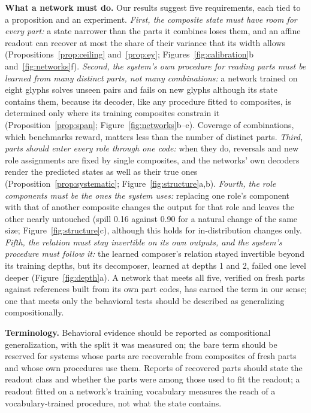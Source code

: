 \documentclass[10pt]{article}
\theoremstyle{plain}
\theoremstyle{remark}
\begin{document}
\textbf{What a network must do.} Our results suggest five requirements, each tied to a proposition and an experiment. \emph{First, the composite state must have room for every part:} a state narrower than the parts it combines loses them, and an affine readout can recover at most the share of their variance that its width allows (Propositions~\ref{prop:ceiling} and~\ref{prop:ey}; Figures~\ref{fig:calibration}b and~\ref{fig:networks}f). \emph{Second, the system's own procedure for reading parts must be learned from many distinct parts, not many combinations:} a network trained on eight glyphs solves unseen pairs and fails on new glyphs although its state contains them, because its decoder, like any procedure fitted to composites, is determined only where its training composites constrain it (Proposition~\ref{prop:span}; Figure~\ref{fig:networks}b--e). Coverage of combinations, which benchmarks reward, matters less than the number of distinct parts. \emph{Third, parts should enter every role through one code:} when they do, reversals and new role assignments are fixed by single composites, and the networks' own decoders render the predicted states as well as their true ones (Proposition~\ref{prop:systematic}; Figure~\ref{fig:structure}a,b). \emph{Fourth, the role components must be the ones the system uses:} replacing one role's component with that of another composite changes the output for that role and leaves the other nearly untouched (spill 0.16 against 0.90 for a natural change of the same size; Figure~\ref{fig:structure}c), although this holds for in-distribution changes only. \emph{Fifth, the relation must stay invertible on its own outputs, and the system's procedure must follow it:} the learned composer's relation stayed invertible beyond its training depths, but its decomposer, learned at depths 1 and 2, failed one level deeper (Figure~\ref{fig:depth}a). A network that meets all five, verified on fresh parts against references built from its own part codes, has earned the term in our sense; one that meets only the behavioral tests should be described as generalizing compositionally.

\textbf{Terminology.} Behavioral evidence should be reported as compositional generalization, with the split it was measured on; the bare term should be reserved for systems whose parts are recoverable from composites of fresh parts and whose own procedures use them. Reports of recovered parts should state the readout class and whether the parts were among those used to fit the readout; a readout fitted on a network's training vocabulary measures the reach of a vocabulary-trained procedure, not what the state contains.
\end{document}

